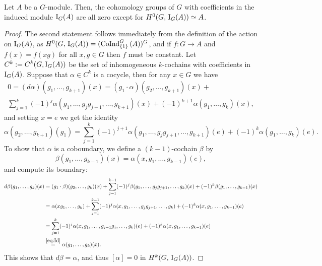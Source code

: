 \documentclass[a4paper, oneside]{memoir}
\begin{document}
\begin{proposition}\label{prop:IndMod}
	Let $A$ be a $G$-module. Then, the cohomology groups of $G$ with coefficients in the induced module $\operatorname{I}_{G}(A)$ are all zero except for $H^{0}( G, \, \operatorname{I}_{G}(A) )\simeq A$.
\end{proposition}

\begin{proof}
	The second statement follows immediately from the definition of the action on $\operatorname{I}_{G}(A)$, as $H^{0}( G, \, \operatorname{I}_{G}(A) )=(\operatorname{CoInd}^G_{\{1\}}{(A)})^G$, and if $f: G\to A$ and $f(x)=f(xg)$ for all $x, g\in G$ then $f$ must be constant.
	Let $C^k:=C^k(G,\operatorname{I}_{G}(A))$ be the set of inhomogeneous $k$-cochains with coefficients in $\operatorname{I}_{G}(A)$. Suppose that $\alpha\in C^{k}$ is a cocycle, then for any $x\in G$ we have
	\begin{align*}
		0 = (d\alpha)(g_1,\dots , g_{k+1})(x) = (g_1\cdot \alpha)(g_2,\dots , g_{k+1})(x) + \\
		\sum_{j=1}^{k} (-1)^j \alpha(g_1,\dots , g_j g_{j+1},\dots , g_{k+1})(x) + (-1)^{k+1} \alpha(g_1,\dots , g_k)(x),
	\end{align*}
	and setting $x=e$ we get the identity
	\begin{equation*}\label{eq:Id}
		\alpha(g_2, \dots , g_{k+1})(g_1) = \sum_{j=1}^{k} (-1)^{j+1} \alpha(g_1,\dots , g_j g_{j+1},\dots , g_{k+1})(e) + (-1)^k \alpha(g_1,\dots , g_k)(e).
	\end{equation*}
	To show that $\alpha$ is a coboundary, we define a $(k-1)$-cochain $\beta$ by
	\[
		\beta(g_1,\dots , g_{k-1})(x) = \alpha(x,g_1,\dots , g_{k-1})(e),
	\]
	and compute its boundary:
	\begin{align*}
		d\beta(g_1,\dots , g_k)(x) & = (g_1\cdot \beta)(g_2,\dots , g_k)(x) + \sum_{j=1}^{k-1} (-1)^j \beta(g_1,\dots , g_j g_{j+1},\dots , g_k)(x) + (-1)^k \beta(g_1,\dots , g_{k-1})(x) \\
		                           & = \alpha(x g_1,\dots , g_k) + \sum_{j=1}^{k-1} (-1)^j \alpha(x,g_1,\dots , g_j g_{j+1},\dots , g_k) + (-1)^k \alpha(x, g_1,\dots , g_{k-1})(e)        \\
		                           & = \sum_{j=1}^k (-1)^j \alpha(x,g_1,\dots , g_{j-1} g_j,\dots , g_k)(e) + (-1)^k \alpha(x,g_1,\dots , g_{k-1})(e)                                      \\
		                           & \overset{\eqref{eq:Id}}{=} \alpha(g_1,\dots , g_k)(x)
		.\end{align*}
	This shows that $d\beta=\alpha$, and thus $[\alpha]=0$ in $H^{k}( G, \, \operatorname{I}_{G}(A) )$.
\end{proof}
\end{document}
